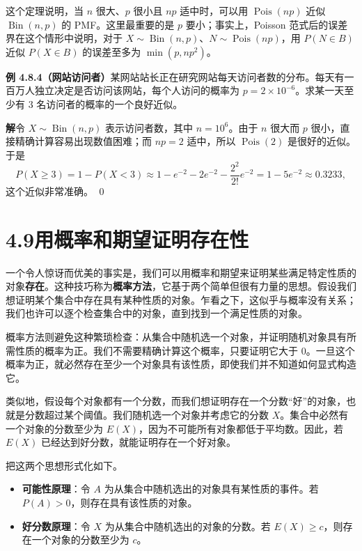 \documentclass[UTF8, 12pt, fontset=fandol, oneside]{ctexart}
\begin{document}
这个定理说明，当 $n$ 很大、$p$ 很小且 $np$ 适中时，可以用 $\operatorname{Pois}(np)$ 近似 $\operatorname{Bin}(n,p)$ 的 PMF。这里最重要的是 $p$ 要小；事实上，Poisson 范式后的误差界在这个情形中说明，对于 $X\sim\operatorname{Bin}(n,p)$、$N\sim\operatorname{Pois}(np)$，用 $P(N\in B)$ 近似 $P(X\in B)$ 的误差至多为 $\min(p,np^2)$。

\noindent\textbf{例 4.8.4（网站访问者）}\quad 某网站站长正在研究网站每天访问者数的分布。每天有一百万人独立决定是否访问该网站，每个人访问的概率为 $p=2\times 10^{-6}$。求某一天至少有 $3$ 名访问者的概率的一个良好近似。

\noindent\textbf{解}\quad 令 $X\sim\operatorname{Bin}(n,p)$ 表示访问者数，其中 $n=10^6$。由于 $n$ 很大而 $p$ 很小，直接精确计算容易出现数值困难；而 $np=2$ 适中，所以 $\operatorname{Pois}(2)$ 是很好的近似。于是
\[
  P(X\ge 3)=1-P(X<3)\approx
  1-e^{-2}-2e^{-2}-\frac{2^2}{2!}e^{-2}
  =1-5e^{-2}\approx 0.3233,
\]
这个近似非常准确。 \qed

\section*{4.9\quad 用概率和期望证明存在性}

一个令人惊讶而优美的事实是，我们可以用概率和期望来证明某些满足特定性质的对象\textbf{存在}。这种技巧称为\textbf{概率方法}，它基于两个简单但很有力量的思想。假设我们想证明某个集合中存在具有某种性质的对象。乍看之下，这似乎与概率没有关系；我们也许可以逐个检查集合中的对象，直到找到一个满足性质的对象。

概率方法则避免这种繁琐检查：从集合中随机选一个对象，并证明随机对象具有所需性质的概率为正。我们不需要精确计算这个概率，只要证明它大于 $0$。一旦这个概率为正，就必然存在至少一个对象具有该性质，即使我们并不知道如何显式构造它。

类似地，假设每个对象都有一个分数，而我们想证明存在一个分数“好”的对象，也就是分数超过某个阈值。我们随机选一个对象并考虑它的分数 $X$。集合中必然有一个对象的分数至少为 $E(X)$，因为不可能所有对象都低于平均数。因此，若 $E(X)$ 已经达到好分数，就能证明存在一个好对象。

把这两个思想形式化如下。
\begin{itemize}
  \item \textbf{可能性原理}：令 $A$ 为从集合中随机选出的对象具有某性质的事件。若 $P(A)>0$，则存在具有该性质的对象。
  \item \textbf{好分数原理}：令 $X$ 为从集合中随机选出的对象的分数。若 $E(X)\ge c$，则存在一个对象的分数至少为 $c$。
\end{itemize}
\end{document}
